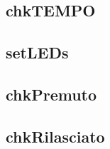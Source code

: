 \documentclass[DIV=24]{scrartcl}
\begin{document}
	\subsection{chkTEMPO}
    \begin{center}
        
    \end{center}
    \subsection{setLEDs}
    \begin{center}
        
    \end{center}       
    \subsection{chkPremuto}
    \begin{center}
        
    \end{center}    
    \subsection{chkRilasciato}
    \begin{center}
        
    \end{center}
\end{document}
